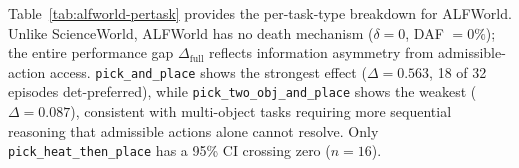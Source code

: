 \documentclass[11pt]{article}
\begin{document}
\begin{table}[h]
\centering
\small
{}
\caption{Cross-environment label distribution. ``Deterministic'' denotes qualitatively different computation modes: ScienceWorld = oracle simulator with ground-truth state; MATH = Python code interpreter; ALFWorld = admissible-action enumeration. $\dagger$\,ALFWorld's deterministic advantage stems from information asymmetry, not death avoidance.}
\label{tab:cross-env}
\end{table}

Table~\ref{tab:alfworld-pertask} provides the per-task-type breakdown for ALFWorld. Unlike ScienceWorld, ALFWorld has no death mechanism ($\delta = 0$, DAF $= 0\%$); the entire performance gap $\Delta_{\text{full}}$ reflects information asymmetry from admissible-action access. \texttt{pick\_and\_place} shows the strongest effect ($\Delta = 0.563$, 18 of 32 episodes det-preferred), while \texttt{pick\_two\_obj\_and\_place} shows the weakest ($\Delta = 0.087$), consistent with multi-object tasks requiring more sequential reasoning that admissible actions alone cannot resolve. Only \texttt{pick\_heat\_then\_place} has a 95\% CI crossing zero ($n{=}16$).
\end{document}
